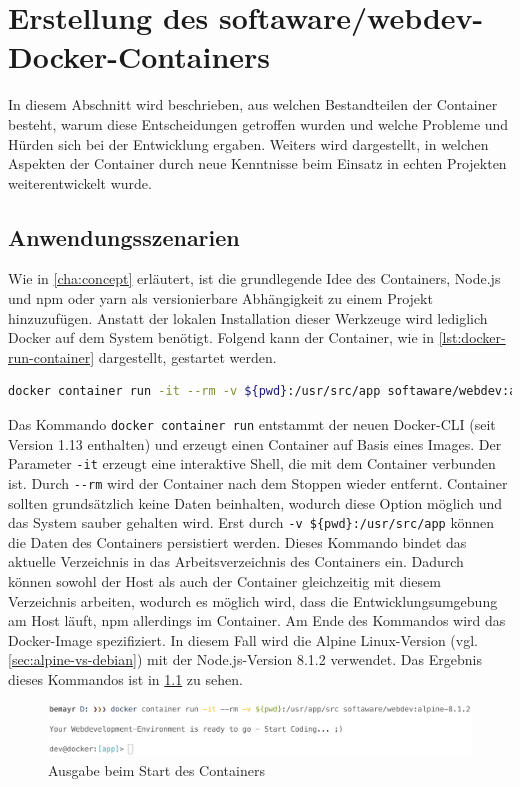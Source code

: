 \chapter{Erstellung des softaware/webdev-\\Docker-Containers}
\label{cha:implementation}
In diesem Abschnitt wird beschrieben, aus welchen Bestandteilen der Container besteht, warum diese Entscheidungen getroffen wurden und welche Probleme und Hürden sich bei der Entwicklung ergaben.
Weiters wird dargestellt, in welchen Aspekten der Container durch neue Kenntnisse beim Einsatz in echten Projekten weiterentwickelt wurde.

\section{Anwendungsszenarien}
\label{sec:usage}
Wie in \cref{cha:concept} erläutert, ist die grundlegende Idee des Containers, Node.js und npm oder yarn als versionierbare Abhängigkeit zu einem Projekt hinzuzufügen.
Anstatt der lokalen Installation dieser Werkzeuge wird lediglich Docker auf dem System benötigt.
Folgend kann der Container, wie in \cref{lst:docker-run-container} dargestellt, gestartet werden.
\begin{lstlisting}[caption=Kommando zum Starten des softaware/webdev-Containers, language=bash, label=lst:docker-run-container]
docker container run -it --rm -v ${pwd}:/usr/src/app softaware/webdev:alpine-8.1.2
\end{lstlisting}
Das Kommando \verb|docker container run| entstammt der neuen Docker-CLI (seit Version 1.13 enthalten) und erzeugt einen Container auf Basis eines Images.
Der Parameter \verb|-it| erzeugt eine interaktive Shell, die mit dem Container verbunden ist.
Durch \verb|--rm| wird der Container nach dem Stoppen wieder entfernt.
Container sollten grundsätzlich keine Daten beinhalten, wodurch diese Option möglich und das System sauber gehalten wird.
Erst durch \verb|-v ${pwd}:/usr/src/app| können die Daten des Containers persistiert werden.
Dieses Kommando bindet das aktuelle Verzeichnis in das Arbeitsverzeichnis des Containers ein.
Dadurch können sowohl der Host als auch der Container gleichzeitig mit diesem Verzeichnis arbeiten, wodurch es möglich wird, dass die Entwicklungsumgebung am Host läuft, npm allerdings im Container.
Am Ende des Kommandos wird das Docker-Image spezifiziert.
In diesem Fall wird die Alpine Linux-Version (vgl. \cref{sec:alpine-vs-debian}) mit der Node.js-Version 8.1.2 verwendet.
Das Ergebnis dieses Kommandos ist in \cref{fig:container-execution} zu sehen.
\begin{figure}[htbp]
    \centering
    \includegraphics[width=0.95\linewidth,clip]{images/container-execution}
    \caption{Ausgabe beim Start des Containers}
\label{fig:container-execution}
\end{figure}

